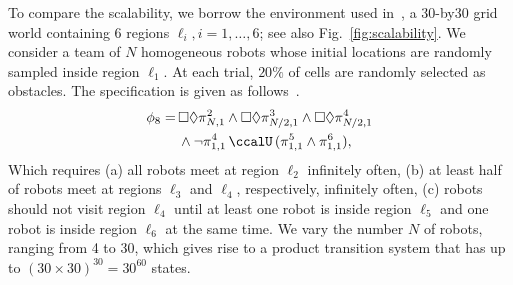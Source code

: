 \documentclass[Afour,sageh,times]{sagej}
\renewcommand{\ap}[3]{\mathcal{\pi}_{{#1},{#2}}^{#3}}
\begin{document}
{To compare the scalability, we borrow the environment used in~\cite{sahin2019multi}, a 30-by30 grid world containing 6 regions $\ell_i, i=1,\ldots,6$; see also Fig.~\ref{fig:scalability}. We consider a team of $N$ homogeneous robots whose initial locations are randomly sampled inside region $\ell_1$. At each trial, $20\%$ of cells are randomly selected as obstacles. The specification is given as follows~\cite{sahin2019multi}.
\begin{align*}
  \phi_8 = \, &  \square \Diamond \ap{N}{1}{2} \wedge \square \Diamond \ap{N/2}{1}{3} \wedge \square \Diamond \ap{N/2}{1}{4} \\
  & \wedge \neg \ap{1}{1}{4} \,\ccalU\, (\ap{1}{1}{5} \wedge \ap{1}{1}{6}),
\end{align*}
Which requires (a) all robots meet at region $\ell_2$ infinitely often, (b) at least half of robots meet at regions $\ell_3$ and $\ell_4$, respectively, infinitely often, (c) robots should not visit region $\ell_4$ until at least one robot is inside region $\ell_5$ and one robot is inside region $\ell_6$ at the same time. We vary the number $N$ of robots, ranging from 4 to 30, which gives rise to a product transition system that has up to $(30\times30)^{30}=30^{60}$ states.

}
\end{document}
